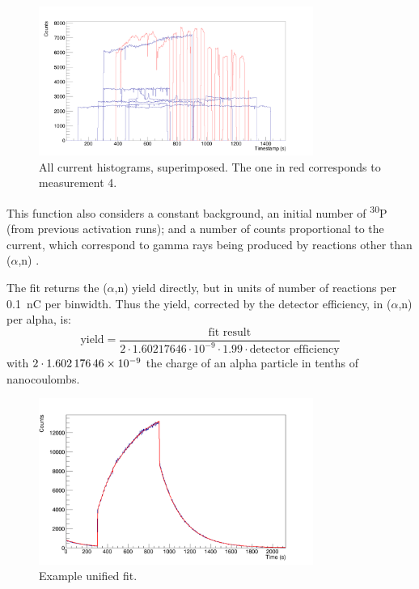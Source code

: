 \documentclass[a4paper,12pt]{report}
\newcommand{\an}{($\alpha$,n) }
\newcommand{\Piso}{\textsuperscript{30}P }
\begin{document}
\begin{figure}[H]
	\centering
	\includegraphics[width=0.80\textwidth]{current_histograms.png}
	\caption{All current histograms, superimposed.
	The one in red corresponds to measurement 4.}
	\label{current_histograms}
\end{figure}

This function also considers a constant background, an initial number of \Piso (from previous activation runs); and a number of counts proportional to the current, which correspond to gamma rays being produced by reactions other than \an.	%

The fit returns the \an yield directly, but in units of number of reactions per \qty{0.1}{\nano\coulomb} per binwidth.
Thus the yield, corrected by the detector efficiency, in \an per alpha, is:
\begin{equation}
	\text{yield} = \frac{\text{fit result}}{2\cdot1.60217646\cdot10^{-9}\cdot 1.99 \cdot \text{detector efficiency}}
\end{equation}
with $2\cdot\num{1.60217646E-9}$ the charge of an alpha particle in tenths of nanocoulombs.
\\

\begin{figure}[H]
	\centering
	\includegraphics[width=0.80\textwidth]{example_unified_fit.png}
	\caption{Example unified fit.}
	\label{example_unified_fit}
\end{figure}
\end{document}
